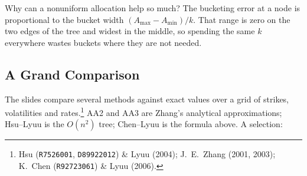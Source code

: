 \begin{intuition}
	Why can a nonuniform allocation help so much?
	The bucketing error at a node is proportional to the bucket width $(A_{\max}-A_{\min})/k$.
	That range is zero on the two edges of the tree and widest in the middle, so spending the same $k$ everywhere wastes buckets where they are not needed.
\end{intuition}

\suppend

\subsection{A Grand Comparison}


The slides compare several methods against exact values over a grid of strikes, volatilities and rates.\footnote{Hsu (\texttt{R7526001}, \texttt{D89922012}) \& Lyuu (2004); J.~E.~Zhang (2001, 2003); K.~Chen (\texttt{R92723061}) \& Lyuu (2006).}
\suppstart
AA2 and AA3 are Zhang's analytical approximations; Hsu--Lyuu is the $O(n^{2})$ tree; Chen--Lyuu is the formula above.
\suppend
A selection:

